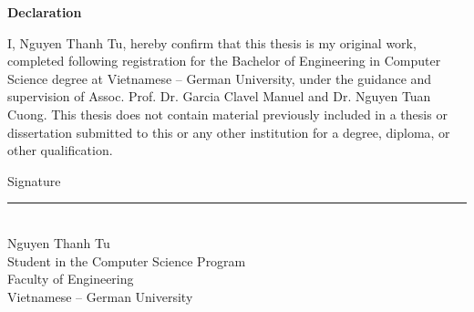 \thispagestyle{empty}
\begin{center}
\vspace*{1.5cm}
{\bfseries\Large Declaration}

\vspace{1.2cm}
\end{center}

\noindent
I, Nguyen Thanh Tu, hereby confirm that this thesis is my original work,
completed following registration for the Bachelor of Engineering in
Computer Science degree at Vietnamese -- German University, under the
guidance and supervision of Assoc. Prof. Dr. Garcia Clavel Manuel and
Dr. Nguyen Tuan Cuong. This thesis does not contain material previously
included in a thesis or dissertation submitted to this or any other
institution for a degree, diploma, or other qualification.

\vspace{3cm}

\begin{center}
Signature

\vspace{2cm}

\rule{6cm}{0.4pt}\\[4pt]
Nguyen Thanh Tu\\
Student in the Computer Science Program\\
Faculty of Engineering\\
Vietnamese -- German University
\end{center}

\clearpage
